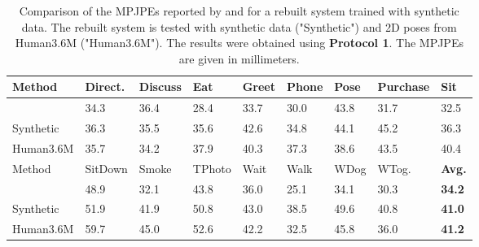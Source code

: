 \begin{table}[]	
	\centering
	\begin{tabularx}{\textwidth}{l *{8}{Y}}
		\toprule
		Method & Direct. & Discuss & Eat & Greet & Phone & Pose & Purchase & Sit \\
		\midrule
		\citet{drover18} & 34.3 & 36.4 & 28.4 & 33.7 & 30.0 & 43.8 & 31.7 & 32.5\\
		Synthetic & 36.3 & 35.5 & 35.6 & 42.6 & 34.8 & 44.1 & 45.2 & 36.3 \\
		Human3.6M & 35.7 & 34.2 & 37.9 & 40.3 & 37.3 & 38.6 & 43.5 & 40.4 \\
		\bottomrule
		\toprule
		Method & SitDown & Smoke & TPhoto & Wait & Walk & WDog & WTog. & \textbf{Avg.}\\
		\midrule
		\citet{drover18} & 48.9 & 32.1 & 43.8 & 36.0 & 25.1 & 34.1 & 30.3 & \textbf{34.2}\\
		Synthetic & 51.9 & 41.9 & 50.8 & 43.0 & 38.5 & 49.6 & 40.8 & \textbf{41.0} \\
		Human3.6M & 59.7 & 45.0 & 52.6 & 42.2 & 32.5 & 45.8 & 36.0 & \textbf{41.2} \\
		\bottomrule
	\end{tabularx}
	\caption{
		Comparison of the MPJPEs reported by \citet{drover18} and for a rebuilt system trained with synthetic data. 
		The rebuilt system is tested with synthetic data ("Synthetic") and 2D poses from Human3.6M  \cite{ionescu14} ("Human3.6M").
		The results were obtained using \textbf{Protocol 1}. The MPJPEs are given in millimeters.
	 }
	\label{tbl:results-original-protocol1}
\end{table}